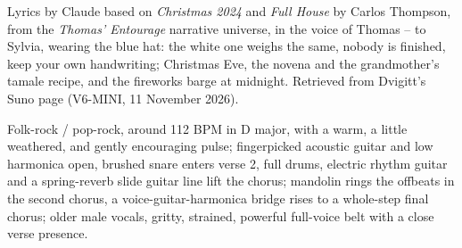 
\label{sec:white-hat-same-weight}
\begin{notes}
Lyrics by Claude based on \emph{Christmas 2024} and \emph{Full House} by Carlos Thompson, from the \emph{Thomas' Entourage} narrative universe, in the voice of Thomas -- to Sylvia, wearing the blue hat: the white one weighs the same, nobody is finished, keep your own handwriting; Christmas Eve, the novena and the grandmother's tamale recipe, and the fireworks barge at midnight. Retrieved from Dvigitt's Suno page (V6-MINI, 11 November 2026).
\end{notes}
\begin{style}
Folk-rock / pop-rock, around 112 BPM in D major, with a warm, a little weathered, and gently encouraging pulse; fingerpicked acoustic guitar and low harmonica open, brushed snare enters verse 2, full drums, electric rhythm guitar and a spring-reverb slide guitar line lift the chorus; mandolin rings the offbeats in the second chorus, a voice-guitar-harmonica bridge rises to a whole-step final chorus; older male vocals, gritty, strained, powerful full-voice belt with a close verse presence.
\end{style}
